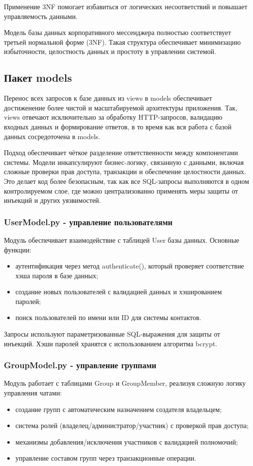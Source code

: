 Применение 3NF помогает избавиться от логических несоответствий и повышает управляемость данными.

Модель базы данных корпоративного мессенджера полностью соответствует третьей нормальной форме (3NF). Такая структура обеспечивает минимизацию избыточности, целостность данных и простоту в управлении системой.

\subsection{Пакет models}

Перенос всех запросов к базе данных из views в models обеспечивает достиженение более чистой и масштабируемой архитектуры приложения. Так, views отвечают исключительно за обработку HTTP-запросов, валидацию входных данных и формирование ответов, в то время как вся работа с базой данных сосредоточена в models.

Подход обеспечивает чёткое разделение ответственности между компонентами системы. Модели инкапсулируют бизнес-логику, связанную с данными, включая сложные проверки прав доступа, транзакции и обеспечение целостности данных. Это делает код более безопасным, так как все SQL-запросы выполняются в одном контролируемом слое, где можно централизованно применять меры защиты от инъекций и других уязвимостей.

\subsubsection{UserModel.py - управление пользователями}
Модуль обеспечивает взаимодействие с таблицей User базы данных. Основные функции:
\begin{itemize}
	\item аутентификация через метод authenticate(), который проверяет соответствие хэша пароля в базе данных;
	\item создание новых пользователей с валидацией данных и хэшированием паролей;
	\item поиск пользователей по имени или ID для системы контактов.
\end{itemize}

Запросы используют параметризованные SQL-выражения для защиты от инъекций. Хэши паролей хранятся с использованием алгоритма bcrypt.

\subsubsection{GroupModel.py - управление группами}
Модуль работает с таблицами Group и GroupMember, реализуя сложную логику управления чатами:
\begin{itemize}
	\item создание групп с автоматическим назначением создателя владельцем;
	\item система ролей (владелец/администратор/участник) с проверкой прав доступа;
	\item механизмы добавления/исключения участников с валидацией полномочий;
	\item управление составом групп через транзакционные операции.
\end{itemize}

